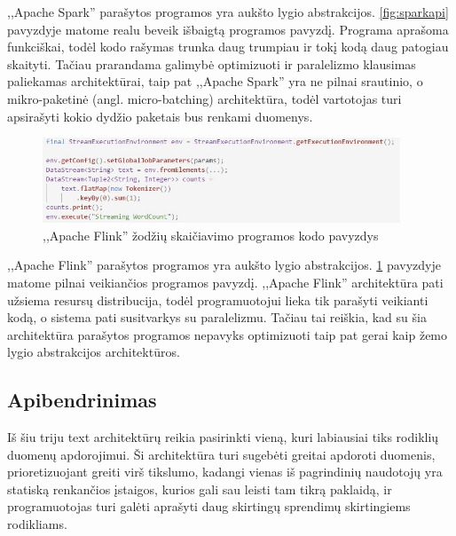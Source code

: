 \documentclass{VUMIFPSkursinis}
\begin{document}
,,Apache Spark'' parašytos programos yra aukšto lygio abstrakcijos. \ref{fig:sparkapi} pavyzdyje matome realu beveik išbaigtą programos pavyzdį. 
Programa aprašoma funkciškai, todėl kodo rašymas trunka daug trumpiau ir tokį kodą daug patogiau skaityti. Tačiau prarandama galimybė optimizuoti
ir paralelizmo klausimas paliekamas architektūrai, taip pat ,,Apache Spark'' yra ne pilnai srautinio, o mikro-paketinė (angl. micro-batching) 
architektūra, todėl vartotojas turi apsirašyti kokio dydžio paketais bus renkami duomenys\cite{shoro2015big}.

\begin{figure}[!htbp]
    \centering
    \includegraphics[width=0.95\textwidth]{img/FlinkAPI.jpg}
    \caption{,,Apache Flink'' žodžių skaičiavimo programos kodo pavyzdys}
    \label{fig:flinkapi}
\end{figure} \par

,,Apache Flink'' parašytos programos yra aukšto lygio abstrakcijos. \ref{fig:flinkapi} pavyzdyje matome pilnai veikiančios programos pavyzdį. ,,Apache Flink'' 
architektūra pati užsiema resursų distribucija, todėl programuotojui lieka tik parašyti veikianti kodą, o sistema pati susitvarkys su paralelizmu. Tačiau 
tai reiškia, kad su šia architektūra parašytos programos nepavyks optimizuoti taip pat gerai kaip žemo lygio abstrakcijos architektūros.

\subsection{Apibendrinimas}
Iš šiu triju text architektūrų reikia pasirinkti vieną, kuri labiausiai tiks rodiklių duomenų apdorojimui. Ši architektūra turi sugebėti greitai apdoroti duomenis,
prioretizuojant greiti virš tikslumo, kadangi vienas iš pagrindinių naudotojų yra statiską renkančios įstaigos, kurios gali sau leisti tam tikrą paklaidą,
ir programuotojas turi galėti aprašyti daug skirtingų sprendimų skirtingiems rodikliams.\par
\end{document}

